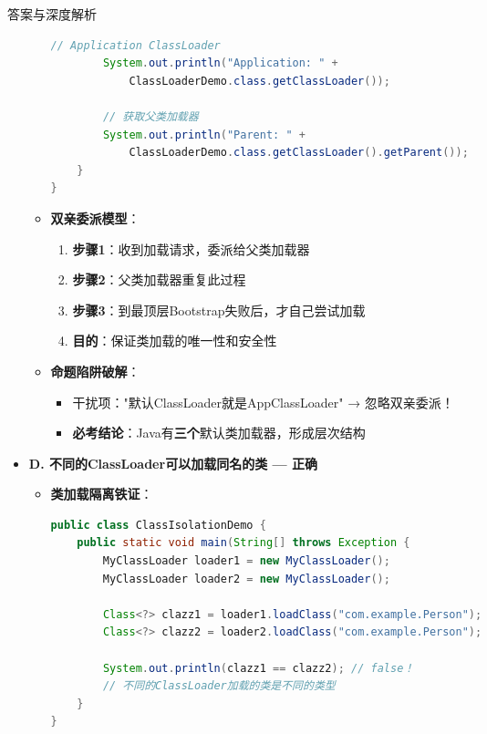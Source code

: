\documentclass[12pt, a4paper]{ctexart}
\begin{document}
\begin{bluebox}{答案与深度解析}
\begin{itemize}[label={}, leftmargin=*, nosep]
\begin{itemize}[label={}, leftmargin=*, nosep]
\begin{lstlisting}[language=Java]
        // Application ClassLoader
        System.out.println("Application: " + 
            ClassLoaderDemo.class.getClassLoader());
        
        // 获取父类加载器
        System.out.println("Parent: " + 
            ClassLoaderDemo.class.getClassLoader().getParent());
    }
}
      \end{lstlisting}

	\item \textbf{双亲委派模型}：
	      \begin{enumerate}
		      \item \textbf{步骤1}：收到加载请求，委派给父类加载器
		      \item \textbf{步骤2}：父类加载器重复此过程
		      \item \textbf{步骤3}：到最顶层Bootstrap失败后，才自己尝试加载
		      \item \textbf{目的}：保证类加载的唯一性和安全性
	      \end{enumerate}

	\item \textbf{命题陷阱破解}：
	      \begin{itemize}[label={}, nosep]
		      \item 干扰项："默认ClassLoader就是AppClassLoader" → 忽略双亲委派！
		      \item \textbf{必考结论}：Java有\textbf{三个}默认类加载器，形成层次结构
	      \end{itemize}
\end{itemize}

\item \textbf{D. 不同的ClassLoader可以加载同名的类 — 正确}
\begin{itemize}[label={}, leftmargin=*, nosep]
	\item \textbf{类加载隔离铁证}：
	      \begin{lstlisting}[language=Java]
public class ClassIsolationDemo {
    public static void main(String[] throws Exception {
        MyClassLoader loader1 = new MyClassLoader();
        MyClassLoader loader2 = new MyClassLoader();
        
        Class<?> clazz1 = loader1.loadClass("com.example.Person");
        Class<?> clazz2 = loader2.loadClass("com.example.Person");
        
        System.out.println(clazz1 == clazz2); // false！
        // 不同的ClassLoader加载的类是不同的类型
    }
}
      \end{lstlisting}


\end{itemize}
\end{itemize}
\end{bluebox}
\end{document}
